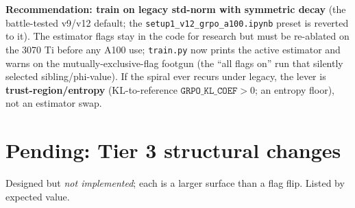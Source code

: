 \documentclass[11pt]{article}
\newcommand{\cd}[1]{\texttt{#1}}
\begin{document}
\textbf{Recommendation: train on legacy std-norm with symmetric decay} (the battle-tested v9/v12 default; the
\cd{setup1\_v12\_grpo\_a100.ipynb} preset is reverted to it). The estimator flags stay in the code for research
but must be re-ablated on the 3070 Ti before any A100 use; \cd{train.py} now prints the active estimator and
warns on the mutually-exclusive-flag footgun (the ``all flags on'' run that silently selected sibling/phi-value).
If the spiral ever recurs under legacy, the lever is \textbf{trust-region/entropy} (KL-to-reference
$\cd{GRPO\_KL\_COEF}>0$; an entropy floor), not an estimator swap.

\section{Pending: Tier 3 structural changes}\label{sec:tier3}
Designed but \emph{not implemented}; each is a larger surface than a flag flip. Listed by expected value.
\end{document}
